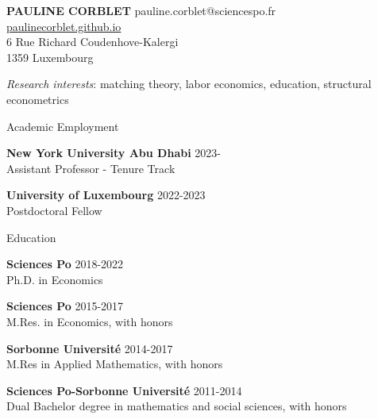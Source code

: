 \documentclass{resume} %
\begin{document}
{\bf \large PAULINE CORBLET} \hfill pauline.corblet@sciencespo.fr\\
{\phantom{smth}} \hfill \href{https://paulinecorblet.github.io}{paulinecorblet.github.io} \\
6 Rue Richard Coudenhove-Kalergi \\ 
1359 Luxembourg

{\large \textit{Research interests}: matching theory, labor economics, education, structural econometrics}


\begin{rSection}{Academic Employment}

{\bf New York University Abu Dhabi} \hfill {2023-} \\
  Assistant Professor - Tenure Track

{\bf University of Luxembourg} \hfill {2022-2023} \\
Postdoctoral Fellow

\end{rSection}

\begin{rSection}{Education}

{\bf Sciences Po} \hfill {2018-2022}
\\ Ph.D. in Economics

{\bf Sciences Po} \hfill {2015-2017}
\\ M.Res. in Economics, with honors

{\bf Sorbonne Université} \hfill {2014-2017}
\\ M.Res in Applied Mathematics, with honors

{\bf Sciences Po-Sorbonne Université} \hfill {2011-2014}
\\ Dual Bachelor degree in mathematics and social sciences, with honors


\end{rSection}

\end{document}
